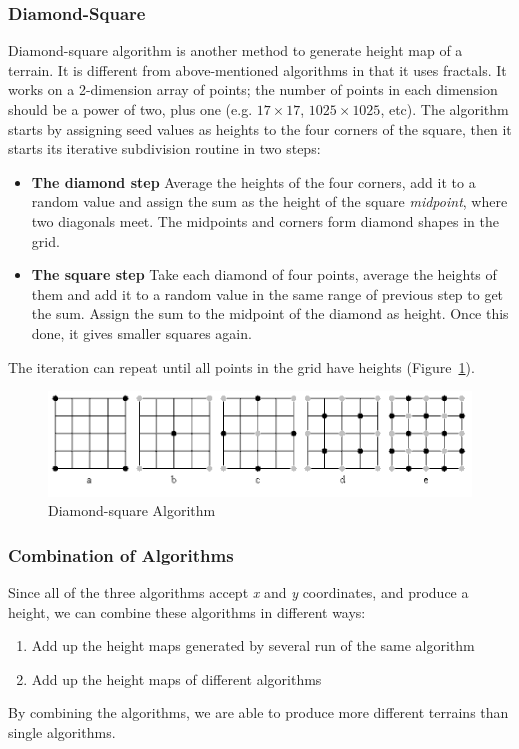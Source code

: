 \subsubsection{Diamond-Square}
Diamond-square algorithm is another method to generate height map of a terrain. It is different from above-mentioned algorithms in that it uses fractals. It works on a 2-dimension array of points; the number of points in each dimension should be a power of two, plus one (e.g. $17 \times 17$, $1025 \times 1025$, etc). The algorithm starts by assigning seed values as heights to the four corners of the square, then it starts its iterative subdivision routine in two steps:
\begin{itemize}
	\item \textbf{The diamond step} Average the heights of the four corners, add it to a random value and assign the sum as the height of the square \textit{midpoint}, where two diagonals meet. The midpoints and corners form diamond shapes in the grid.
	\item \textbf{The square step} Take each diamond of four points, average the heights of them and add it to a random value in the same range of previous step to get the sum. Assign the sum to the midpoint of the diamond as height. Once this done, it gives smaller squares again.
\end{itemize}
The iteration can repeat until all points in the grid have heights (Figure~\ref{fig:dsa}).
\begin{figure}
	\center
	\includegraphics[scale=0.5]{images/dsa.png}
	\caption{Diamond-square Algorithm}
	\label{fig:dsa}
\end{figure}

\subsubsection{Combination of Algorithms}
Since all of the three algorithms accept \textit{x} and \textit{y} coordinates, and produce a height, we can combine these algorithms in different ways:
\begin{enumerate}
	\item Add up the height maps generated by several run of the same algorithm
	\item Add up the height maps of different algorithms
\end{enumerate}

By combining the algorithms, we are able to produce more different terrains than single algorithms.

